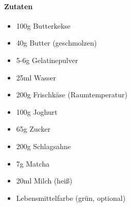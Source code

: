 \newpage
{}

\paragraph{Zutaten}
\begin{itemize}[noitemsep]
	\item 100g Butterkekse
	\item 40g Butter (geschmolzen)
	\item 5-6g Gelatinepulver
	\item 25ml Wasser
	\item 200g Frischkäse (Raumtemperatur)
	\item 100g Joghurt
	\item 65g Zucker
	\item 200g Schlagsahne
	\item 7g Matcha
	\item 20ml Milch (heiß)
	\item Lebensmittelfarbe (grün, optional)
\end{itemize}


